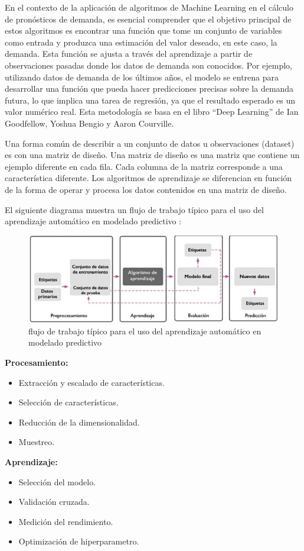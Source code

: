 En el contexto de la aplicación de algoritmos de Machine Learning en el cálculo de pronósticos de demanda, es esencial comprender que el objetivo principal de estos algoritmos es encontrar una función que tome un conjunto de variables como entrada y produzca una estimación del valor deseado, en este caso, la demanda. Esta función se ajusta a través del aprendizaje a partir de observaciones pasadas donde los datos de demanda son conocidos. Por ejemplo, utilizando datos de demanda de los últimos años, el modelo se entrena para desarrollar una función que pueda hacer predicciones precisas sobre la demanda futura, lo que implica una tarea de regresión, ya que el resultado esperado es un valor numérico real. Esta metodología se basa en el libro “Deep Learning” de Ian Goodfellow, Yoshua Bengio y Aaron Courville\cite{goodfellow2016deep}.

Una forma común de describir a un conjunto de datos u observaciones (dataset) es con una matriz de diseño. Una matriz de diseño es una matriz que contiene un ejemplo diferente en cada fila. Cada columna de la matriz corresponde a una característica diferente. Los algoritmos de aprendizaje se diferencian en función de la forma de operar y procesa los datos contenidos en una matriz de diseño\cite{arana2021redes}.

El siguiente diagrama muestra un flujo de trabajo típico para el uso del aprendizaje automático en modelado predictivo \cite{mirjalili2020python}:

\begin{figure}[H]
  \begin{center}
    \includegraphics[scale=0.80]{./uso_aprendisaje_automatico.png}
    \caption{ flujo de trabajo típico para el uso del aprendizaje automático en modelado predictivo}
    \label{fig:perceptron}
  \end{center}
\end{figure}


\textbf{Procesamiento:}
  \begin{itemize}
    \item Extracción y escalado de características.
    \item Selección de características.
    \item Reducción de la dimensionalidad.
    \item Muestreo.
  \end{itemize}
\textbf{Aprendizaje:}
  \begin{itemize}
    \item Selección del modelo.
    \item Validación cruzada.
    \item Medición del rendimiento.
    \item Optimización de hiperparametro.
  \end{itemize}

